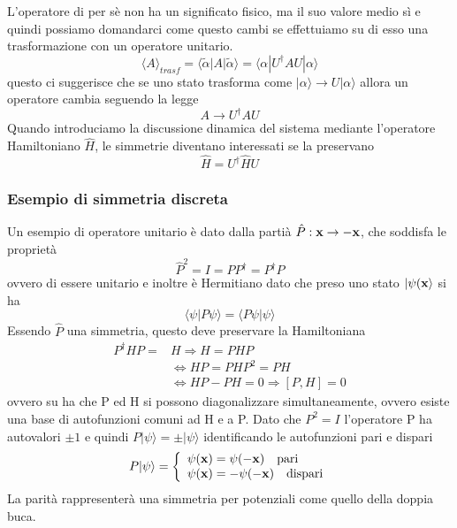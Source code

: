 L'operatore di per s\`e non ha un significato fisico, ma il suo valore medio s\`i e quindi possiamo domandarci come questo cambi se effettuiamo su di esso una trasformazione con un operatore unitario.
\begin{equation*}
	\langle A \rangle_{trasf} = \langle \tilde{\alpha} | A|\tilde{\alpha} \rangle = \langle \alpha| U^{\dag}AU|\alpha \rangle  
\end{equation*}
questo ci suggerisce che se uno stato trasforma come $|\alpha \rangle \to U|\alpha \rangle$ allora un operatore cambia seguendo la legge
\begin{equation*}
	A \to U^{\dag} AU
\end{equation*}
Quando introduciamo la discussione dinamica del sistema mediante l'operatore Hamiltoniano $\hat{H}$, le simmetrie diventano interessati se la preservano 
\begin{equation*}
	\hat{H} = U^\dag \hat{H} U
\end{equation*}

\subsubsection{Esempio di simmetria discreta}
Un esempio di operatore unitario \`e dato dalla parti\`a $\hat{P}: \bold{x} \to - \bold{x}$, che soddisfa le propriet\`a 
\begin{equation*}
\hat{P}^2 =I =PP^{\dag}=P^{\dag}P	
\end{equation*}
ovvero di essere unitario e inoltre \`e Hermitiano dato che preso uno stato $|\psi(\bold{x} \rangle$ si ha
\begin{equation*}
	\langle \psi | P \psi \rangle = \langle P \psi |\psi \rangle  
\end{equation*}
Essendo $\hat{P}$ una simmetria, questo deve preservare la Hamiltoniana
\begin{align*}
	P^\dag H P = & H   \Rightarrow H = PHP \\[0.4cm]
	& \iff HP = PHP^2 =PH \\[0.4cm]
	&\iff  HP-PH =0 \Rightarrow [P,H]=0
\end{align*}
ovvero su ha che P ed H si possono diagonalizzare simultaneamente, ovvero esiste una base di autofunzioni comuni ad H e a P. Dato che $P^2 = I$ l'operatore P ha autovalori $\pm 1$ e quindi $P|\psi \rangle = \pm |\psi \rangle $ identificando le autofunzioni pari e dispari
\begin{equation*}
	P|\psi \rangle = \left \{\begin{array}{l}
		\psi(\bold{x}) = \psi(-\bold{x}) \quad \text{pari} \\
		\psi(\bold{x}) =-  \psi(-\bold{x}) \quad \text{dispari}
	\end{array}\right.
\end{equation*} 
La parit\`a rappresenter\`a una simmetria per potenziali come quello della doppia buca.
  
